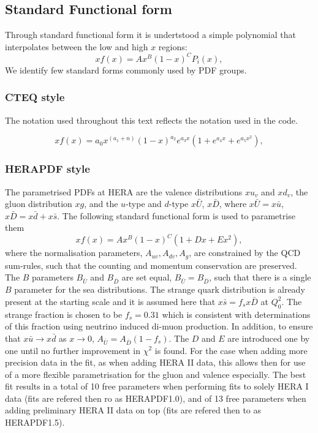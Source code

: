 
\label{sec:pdfparam}
\subsection{Standard Functional form}
Through standard functional form it is undertstood a simple polynomial 
that interpolates between the low and high $x$ regions:
\begin{equation}
 xf(x) = A x^{B} (1-x)^{C} P_i(x),
\label{eqn:pdf_std}
\end{equation}
We identify few standard forms commonly used by PDF groups.

\subsubsection{CTEQ style}
The notation used throughout this text reflects the 
notation used in the code.

\begin{equation}
 xf(x) = a_0 x^{(a_1+n)} (1-x)^{a_2} e^{a_3x} (1 + e^{a_4 x} + e^{a_5 x^2}),
\label{eqn:pdf_cteq}
\end{equation}
%
\subsubsection{HERAPDF style}
 The parametrised PDFs at HERA are the valence distributions
 $xu_v$ and  $xd_v$,  the gluon distribution $xg$, and the $u$-type and $d$-type 
$x\bar{U}$, $x\bar{D}$, where $x\bar{U} = x\bar{u}$, 
$x\bar{D} = x\bar{d} +x\bar{s}$. 
The following standard functional form is used to parametrise them
\begin{equation}
 xf(x) = A x^{B} (1-x)^{C} (1 + D x + E x^2),
\label{eqn:pdf}
\end{equation}
%
where the normalisation parameters, $A_{uv}, A_{dv}, A_g$,  are constrained by  
the QCD sum-rules, such that the counting  and  momentum conservation are preserved.
The $B$ parameters  $B_{\bar{U}}$ and $B_{\bar{D}}$ are set equal,
 $B_{\bar{U}}=B_{\bar{D}}$, such that 
there is a single $B$ parameter for the sea distributions. 
%
The strange quark distribution 
is already present at the starting scale and 
%
it is  assumed here that 
$x\bar{s}= f_s  x\bar{D}$ at $Q^2_0$. 
The  strange fraction is chosen to be $f_s=0.31$ which is
consistent with determinations 
of this fraction using neutrino induced di-muon production. 
%
In addition, to ensure that $x\bar{u} \to x\bar{d}$ 
as $x \to 0$,  
$A_{\bar{U}}=A_{\bar{D}} (1-f_s)$.
%
The $D$ and $E$ are introduced one by one until no further improvement in $\chi^2$ is found.
For the case when adding more precision data in the fit, as when adding HERA II data, this allows then for use of a more flexible parametrisation for the gluon and valence especially.
The best fit  results in a total of 10 free parameters when performing fits to solely HERA I data (fits are refered then ro as HERAPDF1.0), and of 13 free parameters when adding preliminary HERA II data on top (fits are refered then to as HERAPDF1.5).
